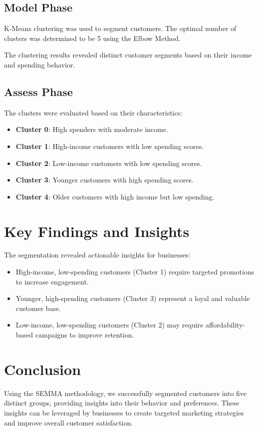 \documentclass[12pt]{article}
\begin{document}
\subsection{Model Phase}
K-Means clustering was used to segment customers. The optimal number of clusters was determined to be 5 using the Elbow Method.

The clustering results revealed distinct customer segments based on their income and spending behavior.

\subsection{Assess Phase}
The clusters were evaluated based on their characteristics:
\begin{itemize}
    \item \textbf{Cluster 0}: High spenders with moderate income.
    \item \textbf{Cluster 1}: High-income customers with low spending scores.
    \item \textbf{Cluster 2}: Low-income customers with low spending scores.
    \item \textbf{Cluster 3}: Younger customers with high spending scores.
    \item \textbf{Cluster 4}: Older customers with high income but low spending.
\end{itemize}

\section{Key Findings and Insights}
The segmentation revealed actionable insights for businesses:
\begin{itemize}
    \item High-income, low-spending customers (Cluster 1) require targeted promotions to increase engagement.
    \item Younger, high-spending customers (Cluster 3) represent a loyal and valuable customer base.
    \item Low-income, low-spending customers (Cluster 2) may require affordability-based campaigns to improve retention.
\end{itemize}

\section{Conclusion}
Using the SEMMA methodology, we successfully segmented customers into five distinct groups, providing insights into their behavior and preferences. These insights can be leveraged by businesses to create targeted marketing strategies and improve overall customer satisfaction.
\end{document}
